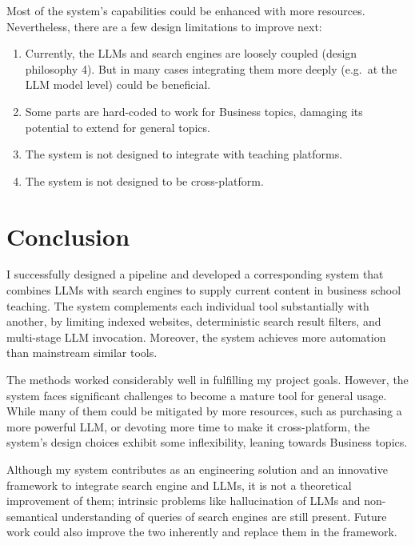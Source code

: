 \documentclass[final-report]{report-template}
\begin{document}
Most of the system's capabilities could be enhanced with more resources.
Nevertheless, there are a few design limitations to improve next: 
\begin{enumerate}
	\item Currently, the LLMs and search engines are loosely coupled (design
		philosophy 4). But in many cases integrating them more deeply (e.g.\ at
		the LLM model level) could be beneficial.
	\item Some parts are hard-coded to work for Business topics, damaging its
		potential to extend for general topics.
	\item The system is not designed to integrate with teaching platforms.
	\item The system is not designed to be cross-platform.
\end{enumerate}

\section{Conclusion}
I successfully designed a pipeline and developed a corresponding system
that combines LLMs with search engines to supply current content in business
school teaching. The system complements each individual tool substantially with
another, by limiting indexed websites, deterministic search result filters, and
multi-stage LLM invocation. Moreover, the system achieves more automation than
mainstream similar tools.

The methods worked considerably well in fulfilling my project goals. However,
the system faces significant challenges to become a mature tool for general
usage. While many of them could be mitigated by more resources, such as
purchasing a more powerful LLM, or devoting more time to make it
cross-platform, the system's design choices exhibit some inflexibility, leaning
towards Business topics.

Although my system contributes as an engineering solution and an innovative
framework to integrate search engine and LLMs, it is not a theoretical
improvement of them; intrinsic problems like hallucination of LLMs and
non-semantical understanding of queries of search engines are still present.
Future work could also improve the two inherently and replace them in the
framework.

\clearpage

 

\end{document}
